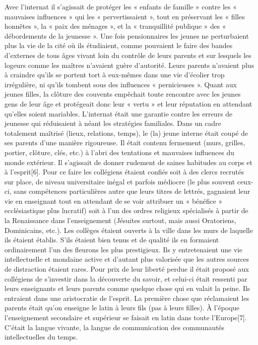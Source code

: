  Avec l'internat il s'agissait de protéger les « enfants de famille » contre les « mauvaises influences » qui les « pervertissaient », tout en préservant les « filles honnêtes », la « paix des ménages », et la « tranquillité publique » des « débordements de la jeunesse ». Une fois pensionnaires les jeunes ne perturbaient plus la vie de la cité où ils étudiaient, comme pouvaient le faire des bandes d'externes de tous âges vivant loin du contrôle de leurs parents et sur lesquels les logeurs comme les maîtres n'avaient guère d'autorité. Leurs parents n'avaient plus à craindre qu'ils se portent tort à eux-mêmes dans une vie d'écolier trop irrégulière, ni qu'ils tombent sous des influences « pernicieuses ». Quant aux jeunes filles, la clôture des couvents empêchait toute rencontre avec les jeunes gens de leur âge et protégeait donc leur « vertu » et leur réputation en attendant qu'elles soient mariables. L'internat était une garantie contre les erreurs de jeunesse qui réduisaient à néant les stratégies familiales. Dans un cadre totalement maîtrisé (lieux, relations, temps), le (la) jeune interne était coupé de ses parents d'une manière rigoureuse. Il était contenu fermement (murs, grilles, portier, clôture, clés, etc.) à l'abri des tentations et mauvaises influences du monde extérieur. Il s'agissait de donner rudement de saines habitudes au corps et à l'esprit[6]. 
 Pour ce faire les collégiens étaient confiés soit à des clercs recrutés sur place, de niveau universitaire inégal et parfois médiocre (le plus souvent ceux-ci, sans compétences particulières autre que leurs titres de lettrés, gagnaient leur vie en enseignant tout en attendant de se voir attribuer un « bénéfice » ecclésiastique plus lucratif) soit à l'un des ordres religieux spécialisés à partir de la Renaissance dans l'enseignement (Jésuites surtout, mais aussi Oratoriens, Dominicains, etc.). Les collèges étaient ouverts à la ville dans les murs de laquelle ils étaient établis. S'ils étaient bien tenus et de qualité ils en formaient ordinairement l'un des fleurons les plus prestigieux. Ils y entretenaient une vie intellectuelle et mondaine active et d'autant plus valorisée que les autres sources de distraction étaient rares. 
 Pour prix de leur liberté perdue il était proposé aux collégiens de s'investir dans la découverte du savoir, et celui-ci était ressenti par leurs enseignants et leurs parents comme quelque chose qui en valait la peine. Ils entraient dans une aristocratie de l'esprit. La première chose que réclamaient les parents était qu'on enseigne le latin à leurs fils (pas à leurs filles). À l'époque l'enseignement secondaire et supérieur se faisait en latin dans toute l'Europe[7]. C'était la langue vivante, la langue de communication des communautés intellectuelles du temps. 
